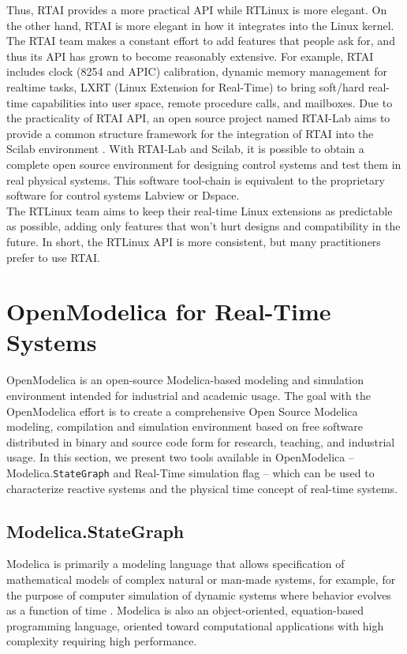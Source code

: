 \documentclass[12pt]{report}
\begin{document}
Thus, RTAI provides a more practical API while RTLinux is more elegant. On the other hand, RTAI is more elegant in how it integrates into the Linux kernel. The RTAI team makes a constant effort to add features that people ask for, and thus its API has grown to become reasonably extensive. For example, RTAI includes clock (8254 and APIC) calibration, dynamic memory management for realtime tasks, LXRT (Linux Extension for Real-Time) to bring soft/hard real-time capabilities into user space, remote procedure calls, and mailboxes. Due to the practicality of RTAI API,  an open source project named  RTAI-Lab aims to provide a common structure framework for the integration of RTAI into the Scilab environment \cite{scilab-rtai}. With RTAI-Lab and Scilab, it is possible to obtain a complete open source environment for designing control systems and test them in real physical systems. This software tool-chain is equivalent to the proprietary software for control systems Labview or Dspace.\\ 

The RTLinux team aims to keep their real-time Linux extensions as predictable as possible, adding only features that won't hurt designs and compatibility in the future. In short, the RTLinux API is more consistent, but many practitioners prefer to use RTAI.  

\section{OpenModelica for Real-Time Systems}
OpenModelica \cite{OM} is an open-source Modelica-based modeling and simulation environment intended for industrial and academic usage. The goal with the OpenModelica effort is to create a comprehensive Open Source Modelica modeling, compilation and simulation environment based on free software distributed in binary and source code form for research, teaching, and industrial usage. In this section, we present two tools available in OpenModelica -- Modelica.\texttt{StateGraph} and Real-Time simulation flag -- which can be used to characterize reactive systems and the physical time concept of real-time systems. 

\subsection{Modelica.StateGraph}
Modelica is primarily a modeling language that allows specification of mathematical models of complex natural or man-made systems, for example, for the purpose of computer simulation of dynamic systems
where behavior evolves as a function of time \cite{OMbook}. Modelica is also an object-oriented, equation-based programming language, oriented toward computational applications with high complexity requiring high performance.
\end{document}

